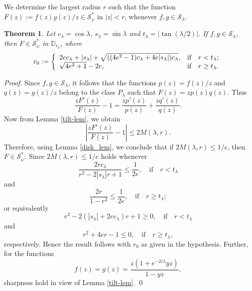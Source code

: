 \documentclass[12pt, reqno]{amsart}
\numberwithin{equation}{section}
\theoremstyle{plain}
\newtheorem{theorem}{Theorem}[section]
\theoremstyle{definition}
\theoremstyle{remark}
\begin{document}
We determine the largest radius $r$ such that the function $F(z):=f(z)g(z)/z\in \mathcal{S}^{*}_{\wp}$ in $|z|<r$, whenever $f,g\in \mathcal{S}_{\lambda}.$
\begin{theorem}\label{2}
	Let $c_{\lambda}=\cos{\lambda}$, $s_{\lambda}=\sin{\lambda}$ and $t_{\lambda}=|\tan({\lambda}/{2})|$. If $f,g\in \mathcal{S}_{\lambda}$, then $F\in\mathcal{S}^{*}_{\wp}$ in $\mathbb{D}_{r_0}$, where
	\begin{equation*}
	r_0:= 
	\left\{
	\begin{array}{lll}
	2ec_{\lambda}+|s_{\lambda}|+\sqrt{((4e^2-1)c_{\lambda}+4e|s_{\lambda}|)c_{\lambda}}, & $if$ & r<t_{\lambda};\\
	\sqrt{4e^2+1}-2e, & $if$ & r\geq t_{\lambda}.	
	\end{array}	
	\right.
	\end{equation*}
\end{theorem}
\begin{proof}
	Since $f,g\in \mathcal{S}_{\lambda}$, it follows that the functions $p(z)=f(z)/z$ and $q(z)=g(z)/z$ belong to the class $P_{\lambda}$ such that $F(z)=zp(z)q(z).$
	Thus
	\begin{equation*}
	\frac{zF'(z)}{F(z)}-1=\frac{zp'(z)}{p(z)}+\frac{zq'(z)}{q(z)}.
	\end{equation*}
	Now from Lemma \ref{tilt-lem}, we obtain
	\begin{equation*}
	\left|\frac{zF'(z)}{F(z)}-1\right|\leq 2M(\lambda,r).
	\end{equation*}
	Therefore, using Lemma \ref{disk_lem}, we conclude that if $2M(\lambda,r)\leq 1/e$, then $F\in\mathcal{S}^{*}_{\wp}$. Since $2M(\lambda,r)\leq 1/e$ holds whenever
	\begin{equation*}
	\frac{2rc_{\lambda}}{r^2-2|s_{\lambda}|r+1} \leq \frac{1}{2e},\quad\text{if}\quad r<t_{\lambda}
	\end{equation*}
	and
	\begin{equation*}
	\frac{2r}{1-r^2}\leq \frac{1}{2e},\quad \text{if}\quad r\geq t_{\lambda};
	\end{equation*}
	or equivalently
	\begin{equation*}
	r^2-2(|s_{\lambda}|+2ec_{\lambda})r+1\geq0,\quad \text{if}\quad r<t_{\lambda}
	\end{equation*}
	and
	\begin{equation*}
	r^2+4er-1\leq0,\quad \text{if}\quad r\geq t_{\lambda},
	\end{equation*}
	respectively. Hence the result follows with $r_0$ as given in the hypothesis. Further, for the functions
	$$f(z)=g(z)=\frac{z(1+e^{-2i\lambda}yz)}{1-yz},$$
	sharpness hold in view of Lemma \ref{tilt-lem}. \qed
\end{proof}
\end{document}
